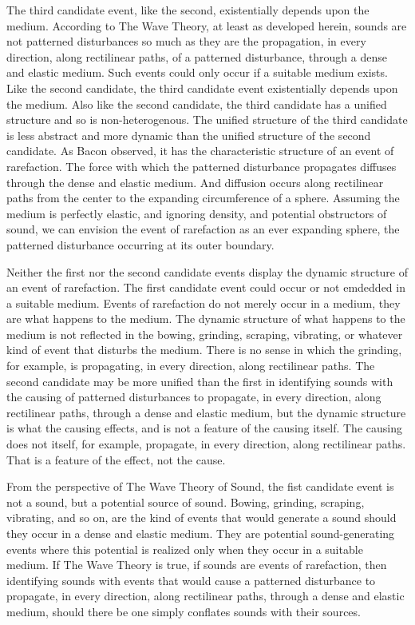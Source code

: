 \documentclass[12pt]{article}
\begin{document}
The third candidate event, like the second, existentially depends upon the me\-di\-um. According to The Wave Theory, at least as developed herein, sounds are not patterned disturbances so much as they are the propagation, in every direction, along rectilinear paths, of a patterned disturbance, through a dense and elastic medium. Such events could only occur if a suitable medium exists. Like the second candidate, the third candidate event existentially depends upon the medium. Also like the second candidate, the third candidate has a unified structure and so is non-heterogenous. The unified structure of the third candidate is less abstract and more dynamic than the unified structure of the second candidate. As Bacon observed, it has the characteristic structure of an event of rarefaction. The force with which the patterned disturbance propagates diffuses through the dense and elastic medium. And diffusion occurs along rectilinear paths from the center to the expanding circumference of a sphere. Assuming the medium is perfectly elastic, and ignoring density, and potential obstructors of sound, we can envision the event of rarefaction as an ever expanding sphere, the patterned disturbance occurring at its outer boundary. 

Neither the first nor the second candidate events display the dynamic structure of an event of rarefaction. The first candidate event could occur or not emdedded in a suitable medium. Events of rarefaction do not merely occur in a medium, they are what happens to the medium. The dynamic structure of what happens to the medium is not reflected in the bowing, grinding, scraping, vibrating, or whatever kind of event that disturbs the medium. There is no sense in which the grinding, for example, is propagating, in every direction, along rectilinear paths. The second candidate may be more unified than the first in identifying sounds with the causing of patterned disturbances to propagate, in every direction, along rectilinear paths, through a dense and elastic medium, but the dynamic structure is what the causing effects, and is not a feature of the causing itself. The causing does not itself, for example, propagate, in every direction, along rectilinear paths. That is a feature of the effect, not the cause.

From the perspective of The Wave Theory of Sound, the fist candidate event is not a sound, but a potential source of sound. Bowing, grinding, scraping, vibrating, and so on, are the kind of events that would generate a sound should they occur in a dense and elastic medium. They are potential sound-generating events where this potential is realized only when they occur in a suitable medium. If The Wave Theory is true, if sounds are events of rarefaction, then identifying sounds with events that would cause a patterned disturbance to propagate, in every direction, along rectilinear paths, through a dense and elastic medium, should there be one simply conflates sounds with their sources.
\end{document}

